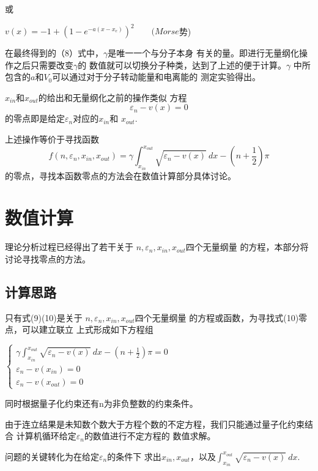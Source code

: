 \documentclass[11pt, a4paper, oneside]{ctexart}
\begin{document}
{{{{        
        或

\begin{center}
        $v(x)=-1+(1-e^{-a(x-x_{e})})^2\qquad (Morse$势)
    \end{center}

    在最终得到的（8）式中，$\gamma$是唯一一个与分子本身
    有关的量。即进行无量纲化操作之后只需要改变$\gamma$的
    数值就可以切换分子种类，达到了上述的便于计算。$\gamma$
    中所包含的$a$和$V_0$可以通过对于分子转动能量和电离能的
    测定实验得出。 

    $x_{in}$和$x_{out}$的给出和无量纲化之前的操作类似
    方程
    \begin{equation}
        \varepsilon_n-v(x)=0
    \end{equation}
的零点即是给定$\varepsilon_n$对应的$x_{in}$和
    $x_{out}$.

    上述操作等价于寻找函数
    \begin{equation}
        f(n,\varepsilon_n,x_{in},x_{out})
        =\gamma \int ^{x_{out}} _{x_{in}}
        \sqrt{\varepsilon_n-v(x)}\ dx-
        (n+\frac 1 2 )\pi
    \end{equation}
的零点，寻找本函数零点的方法会在数值计算部分具体讨论。
}
\newpage
\section{数值计算}
{
    理论分析过程已经得出了若干关于
    ${n,\varepsilon_n,x_{in},x_{out}}$四个无量纲量
    的方程，本部分将讨论寻找零点的方法。
}
\subsection{计算思路}
{
    只有式(9)(10)是关于
    ${n,\varepsilon_n,x_{in},x_{out}}$四个无量纲量
    的方程或函数，为寻找式(10)零点，可以建立联立
    上式形成如下方程组
    {
        \begin{center}
            $\left \{\begin{matrix}
                \gamma \int ^{x_{out}} _{x_{in}}
            \sqrt{\varepsilon_n-v(x)}\ dx-
            (n+\frac 1 2 )\pi=0
                \\ \varepsilon_n-v(x_{in})=0 
                \\ \varepsilon_n-v(x_{out})=0 
                
            \end{matrix}\right.$
        \end{center}
    }


    同时根据量子化约束还有n为非负整数的约束条件。
    \par 由于连立结果是未知数个数大于方程个数的不定方程，我们只能通过量子化约束结合
    计算机循环给定$\varepsilon_n$的数值进行不定方程的
    数值求解。
    \par 问题的关键转化为在给定$\varepsilon_n$的条件下
    求出$x_{in},x_{out}$，以及$\int ^{x_{out}} _{x_{in}}
    \sqrt{\varepsilon_n-v(x)}\ dx$.
}

}}}
\end{document}
